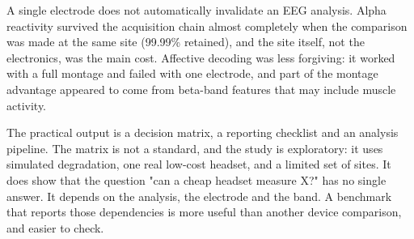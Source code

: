 A single electrode does not automatically invalidate an EEG analysis. Alpha reactivity
survived the acquisition chain almost completely when the comparison was made at the
same site (99.99\% retained), and the site itself, not the electronics, was the main
cost. Affective decoding was less forgiving: it worked with a full montage and failed
with one electrode, and part of the montage advantage appeared to come from beta-band
features that may include muscle activity.

The practical output is a decision matrix, a reporting checklist and an analysis
pipeline. The matrix is not a standard, and the study is exploratory: it uses simulated
degradation, one real low-cost headset, and a limited set of sites. It does show that
the question "can a cheap headset measure X?" has no single answer. It depends on the
analysis, the electrode and the band. A benchmark that reports those dependencies is
more useful than another device comparison, and easier to check.
